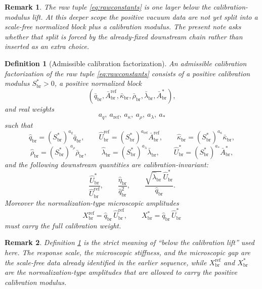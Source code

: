 \documentclass[11pt]{article}
\newcommand{\RespMicroRef}{X_{\mathrm{br}}^{\mathrm{ref}}}
\newcommand{\RespMicroEq}{X_{\mathrm{br}}^{\ast}}
\newcommand{\RespScaleEq}{S_{\mathrm{br}}^{\ast}}
\newcommand{\RespScaleReadout}{\bar q_{\mathrm{br}}}
\newcommand{\RespScaleAmpRef}{\bar A_{\mathrm{br}}^{\mathrm{ref}}}
\newcommand{\RespScaleCov}{\bar\kappa_{\mathrm{br}}}
\newcommand{\RespScaleRelax}{\bar\rho_{\mathrm{br}}}
\newcommand{\RespScaleWell}{\bar\lambda_{\mathrm{br}}}
\newcommand{\RespScaleAmpEq}{\bar A_{\mathrm{br}}^{\ast}}
\newcommand{\RespRawReadout}{\widehat q_{\mathrm{br}}}
\newcommand{\RespRawRef}{\widehat U_{\mathrm{br}}^{\mathrm{ref}}}
\newcommand{\RespRawCov}{\widehat\kappa_{\mathrm{br}}}
\newcommand{\RespRawRelax}{\widehat\rho_{\mathrm{br}}}
\newcommand{\RespRawWell}{\widehat\lambda_{\mathrm{br}}}
\newcommand{\RespRawEq}{\widehat U_{\mathrm{br}}^{\ast}}
\newcommand{\RespRawIso}{\widehat\eta_{\mathrm{br}}}
\newtheorem{definition}{Definition}
\newtheorem{remark}{Remark}
\begin{document}
\begin{remark}
The raw tuple \eqref{eq:rawconstants} is one layer below the calibration-modulus lift. At this deeper scope the positive vacuum data are not yet split into a scale-free normalized block plus a calibration modulus. The present note asks whether that split is forced by the already-fixed downstream chain rather than inserted as an extra choice.
\end{remark}

\begin{definition}[Admissible calibration factorization]
\label{def:factorization}
An \emph{admissible calibration factorization} of the raw tuple \eqref{eq:rawconstants} consists of a positive calibration modulus \(\RespScaleEq>0\), a positive normalized block
\[
(\RespScaleReadout,\RespScaleAmpRef,\RespScaleCov,\RespScaleRelax,\RespScaleWell,\RespScaleAmpEq),
\]
and real weights
\[
a_q,\ a_{\mathrm{ref}},\ a_\kappa,\ a_\rho,\ a_\lambda,\ a_\ast
\]
such that
\begin{equation}
\RespRawReadout=(\RespScaleEq)^{a_q}\RespScaleReadout,
\qquad
\RespRawRef=(\RespScaleEq)^{a_{\mathrm{ref}}}\RespScaleAmpRef,
\qquad
\RespRawCov=(\RespScaleEq)^{a_\kappa}\RespScaleCov,
\label{eq:genfactorA}
\end{equation}
\begin{equation}
\RespRawRelax=(\RespScaleEq)^{a_\rho}\RespScaleRelax,
\qquad
\RespRawWell=(\RespScaleEq)^{a_\lambda}\RespScaleWell,
\qquad
\RespRawEq=(\RespScaleEq)^{a_\ast}\RespScaleAmpEq,
\label{eq:genfactorB}
\end{equation}
and the following downstream quantities are calibration-invariant:
\begin{equation}
\frac{\RespRawEq}{\RespRawRef},
\qquad
\frac{\RespRawIso}{\RespRawReadout^2},
\qquad
\frac{\sqrt{\RespRawWell}\,\RespRawEq}{\RespRawReadout}.
\label{eq:calinvariants}
\end{equation}
Moreover the normalization-type microscopic amplitudes
\begin{equation}
\RespMicroRef=\RespRawReadout\,\RespRawRef,
\qquad
\RespMicroEq=\RespRawReadout\,\RespRawEq
\label{eq:microampweights}
\end{equation}
must carry the full calibration weight.
\end{definition}

\begin{remark}
Definition \ref{def:factorization} is the strict meaning of ``below the calibration lift'' used here. The response scale, the microscopic stiffness, and the microscopic gap are the scale-free data already identified in the earlier sequence, while \(\RespMicroRef\) and \(\RespMicroEq\) are the normalization-type amplitudes that are allowed to carry the positive calibration modulus.
\end{remark}
\end{document}
